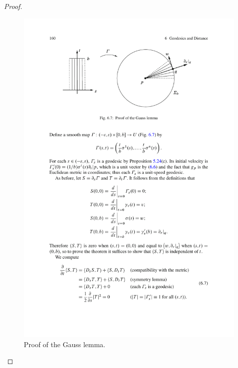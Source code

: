\begin{proof}
\begin{figure}[htbp]
\includegraphics{pictures/Gauss-lemma}
\caption{Proof of the Gauss lemma.}
\end{figure}


\end{proof}
